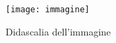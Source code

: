 \begin{figure}[H]
    \centering
    \texttt{[image: immagine]}
    \caption{Didascalia dell'immagine}
\end{figure}
